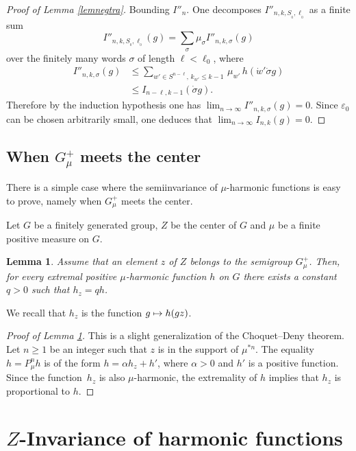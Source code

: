 \documentclass[JEP,XML,SOM,Unicode]{cedram}
\def\mto{\mathchoice{\longmapsto}{\mapsto}{\mapsto}{\mapsto}}
\newtheorem{Lem}[Thm]{Lemma}
\theoremstyle{definition}
\let\al\alpha
\let\eps\varepsilon
\let\si\sigma
\let\bq\relax
\let\eq\relax
\let\ra\to
\begin{document}
\begin{proof}[Proof of Lemma \ref{lemnegtra}]
Bounding $I''_n$. One decomposes $I''_{n,k,S_{_0},\ell_{_0}}$
as a finite sum
\[
I''_{n,k,S_{_0},\ell_{_0}}(g)=\sum_{\si} \mu_{\si}I''_{n,k,\si}(g)
\]
over the finitely many words $\si$ of length $\ell<\ell_0$,
where
\begin{align*}
I''_{n,k,\si}(g)& \leq
\sum_{w'\in S^{n-\ell},\, k_{w'}\leq k-1}\, \mu_{w'}\, h({\dot{w}}'\dot{\si}g)\\
&\leq I_{n-\ell,k-1}(\dot{\si}g).
\end{align*}
Therefore by the induction hypothesis one has $\lim_{n\ra\infty}I''_{n,k,\si}(g)=0$.
Since $\eps_0$ can be chosen arbitrarily small, one deduces that
$\lim_{n\ra\infty}I_{n,k}(g)=0$.
\end{proof}

\subsection{When $G_\mu^+$ meets the center}
\label{secgmucen}

\bq
There is a simple case where the semiinvariance of $\mu$-harmonic
functions is easy to prove, namely when $G_\mu^+$ meets the center.
\eq

Let $G$ be a finitely generated group, $Z$ be the center of $G$ and
$\mu$ be a finite positive measure on $G$.

\begin{Lem}
\label{lemgmucen}
Assume that an element $z$ of $Z$
belongs to the semigroup $G_\mu^+$.
Then, for every extremal positive
$\mu$-harmonic function $h$ on $G$
there exists a constant $q>0$ such that $h_z=qh$.
\end{Lem}

We recall that $h_z$ is the function $g\mto h(gz)$.

\begin{proof}[Proof of Lemma \ref{lemgmucen}]
This is a slight generalization of the Choquet--Deny
theorem. Let $n\geq 1$ be an integer such that $z$ is in the support
of $\mu^{*n}$. The equality $h=P^n_\mu h$ is of the form
$h= \al h_z +h'$, where $\al>0$ and $h'$ is a positive function.
Since the function~$h_z$ is also $\mu$-harmonic, the extremality of $h$
implies that $h_z$ is proportional to $h$.
\end{proof}

\section{\texorpdfstring{$Z$}{Z}-Invariance of harmonic functions}
\label{secinvhar}
\end{document}

